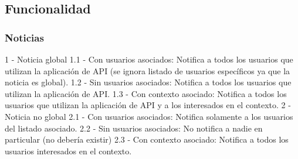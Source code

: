 \subsection{Funcionalidad}
\label{funcionalidad}


\subsubsection{Noticias}
\label{funcionalidad_noticias}

1 - Noticia global
1.1 - Con usuarios asociados: Notifica a todos los usuarios que utilizan la aplicación de API (se ignora listado de usuarios específicos ya que la noticia es global).
1.2 - Sin usuarios asociados: Notifica a todos los usuarios que utilizan la aplicación de API.
1.3 - Con contexto asociado: Notifica a todos los usuarios que utilizan la aplicación de API y a los interesados en el contexto.
2 - Noticia no global
2.1 - Con usuarios asociados: Notifica solamente a los usuarios del listado asociado.
2.2 - Sin usuarios asociados: No notifica a nadie en particular (no debería existir)
2.3 - Con contexto asociado: Notifica a todos los usuarios interesados en el contexto.
